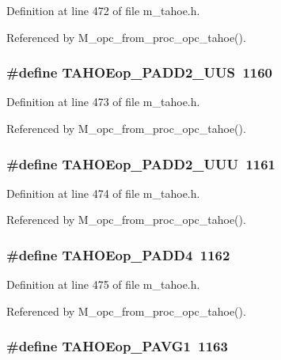 Definition at line 472 of file m\_\-tahoe.h.

Referenced by M\_\-opc\_\-from\_\-proc\_\-opc\_\-tahoe().
\subsubsection{\setlength{\rightskip}{0pt plus 5cm}\#define TAHOEop\_\-PADD2\_\-UUS~1160}\label{m__tahoe_8h_f5b60abd29e8eee2f70712ed7503ec79}




Definition at line 473 of file m\_\-tahoe.h.

Referenced by M\_\-opc\_\-from\_\-proc\_\-opc\_\-tahoe().
\subsubsection{\setlength{\rightskip}{0pt plus 5cm}\#define TAHOEop\_\-PADD2\_\-UUU~1161}\label{m__tahoe_8h_80859f0b6ffd6f51349f164dcadf9839}




Definition at line 474 of file m\_\-tahoe.h.

Referenced by M\_\-opc\_\-from\_\-proc\_\-opc\_\-tahoe().
\subsubsection{\setlength{\rightskip}{0pt plus 5cm}\#define TAHOEop\_\-PADD4~1162}\label{m__tahoe_8h_3e58e59f2155bd6e606f581052077071}




Definition at line 475 of file m\_\-tahoe.h.

Referenced by M\_\-opc\_\-from\_\-proc\_\-opc\_\-tahoe().
\subsubsection{\setlength{\rightskip}{0pt plus 5cm}\#define TAHOEop\_\-PAVG1~1163}\label{m__tahoe_8h_f3c9df51a06623527a0547b4c1c5e775}




